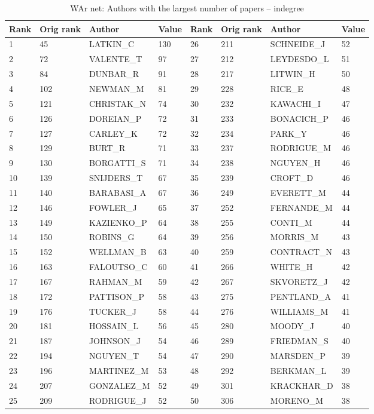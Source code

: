 \documentclass[11pt]{article} %
\begin{document}
\begin{table}
\caption{WAr net: \label{numpap} Authors with the largest number of papers -- indegree}
\renewcommand{\arraystretch}{0.9}
\begin{center}
\begin{tabular}{|l|l|l|l||l|l|l|l|}  \hline  
Rank & Orig rank & Author & Value & Rank & Orig rank & Author & Value \\ \hline 
1	&45	&LATKIN\_C	&130	    &	   26	&211	&SCHNEIDE\_J	&52   \\
2	&72	&VALENTE\_T	&97	    &	   27	&212	&LEYDESDO\_L	&51     \\
3	&84	&DUNBAR\_R	&91	    &	   28	&217	&LITWIN\_H	&50     \\
4	&102	&NEWMAN\_M	&81	    &	   29	&228	&RICE\_E &48            \\
5	&121	&CHRISTAK\_N	&74	     &	   30	&232	&KAWACHI\_I	&47    \\
6	&126	&DOREIAN\_P	&72	     &	   31	&233	&BONACICH\_P	&46    \\
7	&127	&CARLEY\_K	&72	     &	   32	&234	&PARK\_Y &46           \\
8	&129	&BURT\_R		&71 &	   33	&237	&RODRIGUE\_M  &46      \\
9	&130	&BORGATTI\_S	&71	     &	   34	&238	&NGUYEN\_H	&46    \\
10	&139	&SNIJDERS\_T	&67	     &	   35	&239	&CROFT\_D	&46   \\
11	&140	&BARABASI\_A	&67	     &	   36	&249	&EVERETT\_M	&44     \\
12	&146	&FOWLER\_J	&65	     &	   37	&252	&FERNANDE\_M	&44    \\
13	&149	&KAZIENKO\_P	&64	     &	   38	&255	&CONTI\_M	&44    \\
14	&150	&ROBINS\_G	&64	     &	   39	&256	&MORRIS\_M	&43    \\
15	&152	&WELLMAN\_B	&63	     &	   40	&259	&CONTRACT\_N	&43    \\
16	&163	&FALOUTSO\_C	&60	     &	   41	&266	&WHITE\_H	&42    \\
17	&167	&RAHMAN\_M	&59	     &	   42	&267	&SKVORETZ\_J	&42    \\
18	&172	&PATTISON\_P	&58	     &	   43	&275	&PENTLAND\_A	&41    \\
19	&176	&TUCKER\_J	&58	     &	   44	&276	&WILLIAMS\_M	&41  \\
20	&181	&HOSSAIN\_L	&56	     &	   45	&280	&MOODY\_J	&40  \\
21	&187	&JOHNSON\_J	&54	     &	   46	&289	&FRIEDMAN\_S	&40  \\
22	&194	&NGUYEN\_T	&54	     &	   47	&290	&MARSDEN\_P	&39    \\
23	&196	&MARTINEZ\_M	&53  &	   48	& 292	& BERKMAN\_L	& 39 \\
24	&207	&GONZALEZ\_M	&52  &	   49	  & 301	& KRACKHAR\_D	& 38     \\
25	&209	&RODRIGUE\_J	&52  &	   50	&306	& MORENO\_M	& 38          \\ \hline 
\end{tabular}
\end{center}
\end{table}
\end{document}
